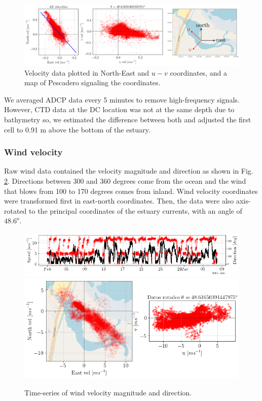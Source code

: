 \documentclass[tesis.tex]{subfiles}
\begin{document}
\begin{figure}[h!]
    \centering
    \includegraphics[width=\textwidth]{Imagenes/rotacion.png}
    \caption{Velocity data plotted in North-East and $u-v$ coordinates, and a map of Pescadero signaling the coordinates.}
    \label{fig:rotacion}
\end{figure}

We averaged ADCP data every 5 minutes to remove high-frequency signals. However, CTD data at the DC location was not at the same depth due to bathymetry so, we estimated the difference between both and adjusted the first cell to 0.91 m above the bottom of the estuary. 

\subsubsection{Wind velocity}

Raw wind data contained the velocity magnitude and direction as shown in Fig. \ref{fig:wind_raw}. Directions between 300 and 360 degrees come from the ocean and the wind that blows from 100 to 170 degrees comes from inland. Wind velocity coordinates were transformed first in east-north coordinates. Then, the data were also axis-rotated to the principal coordinates of the estuary currents, with an angle of $48.6^o$.

\begin{figure}[h!]
    \centering
    \includegraphics[width=\textwidth]{Imagenes/wind_raw.png}
    \includegraphics[width=\textwidth]{Imagenes/wind_rotation.png}
    \caption{Time-series of wind velocity magnitude and direction.}
    \label{fig:wind_raw}
\end{figure}
\end{document}
